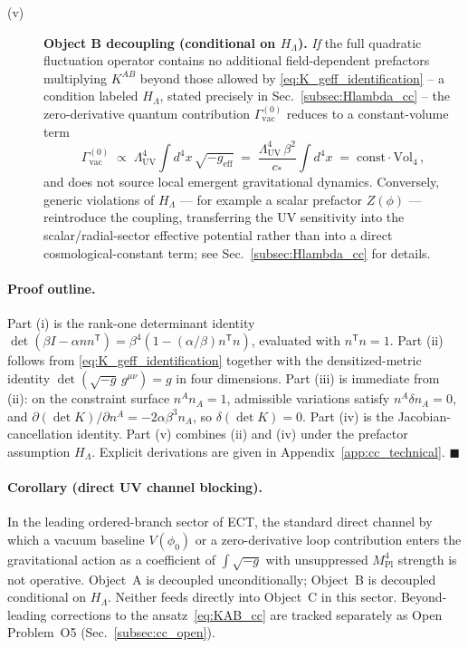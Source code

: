 \begin{description}
\item[(v)] \textbf{Object B decoupling (conditional on $H_\Lambda$).}
\emph{If} the full quadratic fluctuation operator contains
no additional field-dependent prefactors multiplying $K^{AB}$ beyond
those allowed by \eqref{eq:K_geff_identification} -- a condition
labeled $H_\Lambda$, stated precisely in Sec.~\ref{subsec:Hlambda_cc} -- the
zero-derivative quantum contribution $\Gamma_{\mathrm{vac}}^{(0)}$
reduces to a constant-volume term
\begin{equation}
\Gamma_{\mathrm{vac}}^{(0)} \;\propto\;
\Lambda_{\mathrm{UV}}^4 \int d^4 x \, \sqrt{-g_{\mathrm{eff}}}
\;=\; \frac{\Lambda_{\mathrm{UV}}^4\,\beta^2}{c_*}
\int d^4 x \;=\; \mathrm{const}\cdot \mathrm{Vol}_4\,,
\label{eq:B_decoupling}
\end{equation}
and does not source local emergent gravitational dynamics.
Conversely, generic violations of $H_\Lambda$ --- for example a
scalar prefactor $Z(\phi)$ --- reintroduce the coupling,
transferring the UV sensitivity into the scalar/radial-sector
effective potential rather than into a direct
cosmological-constant term; see Sec.~\ref{subsec:Hlambda_cc} for
details.
\end{description}

\paragraph{Proof outline.} Part (i) is the rank-one determinant
identity $\det(\beta I - \alpha n n^{\mathsf T}) = \beta^4(1 -
(\alpha/\beta) n^{\mathsf T} n)$, evaluated with $n^{\mathsf T} n = 1$.
Part (ii) follows from \eqref{eq:K_geff_identification} together with
the densitized-metric identity $\det(\sqrt{-g}\,g^{\mu\nu}) = g$ in
four dimensions. Part (iii) is immediate from (ii): on the constraint
surface $n^A n_A = 1$, admissible variations satisfy
$n^A \delta n_A = 0$, and
$\partial(\det K)/\partial n^A = -2\alpha\beta^3 n_A$, so
$\delta(\det K) = 0$. Part (iv) is the Jacobian-cancellation identity.
Part (v) combines (ii) and (iv) under the prefactor assumption $H_\Lambda$.
Explicit derivations are given in Appendix~\ref{app:cc_technical}.
$\blacksquare$

\paragraph{Corollary (direct UV channel blocking).}
In the leading ordered-branch sector of ECT, the standard direct
channel by which a vacuum baseline $V(\phi_0)$ or a zero-derivative
loop contribution enters the gravitational action as a coefficient of
$\int\sqrt{-g}$ with unsuppressed $M_{\mathrm{Pl}}^4$ strength is not
operative. Object~A is decoupled unconditionally; Object~B is decoupled
conditional on $H_\Lambda$. Neither feeds directly into Object~C in this sector. Beyond-leading
corrections to the ansatz~\eqref{eq:KAB_cc} are tracked
separately as Open Problem~O5 (Sec.~\ref{subsec:cc_open}).

